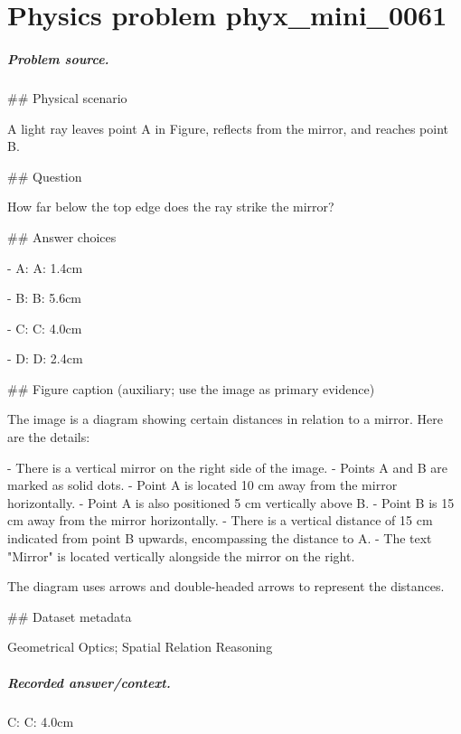
\chapter{Physics problem phyx\_mini\_0061}
\label{ch:PhyXMiniProblems_problem_phyx_mini_0061}

\paragraph{Problem source.}
\#\# Physical scenario

A light ray leaves point A in Figure, reflects from the mirror, and reaches point B.

\#\# Question

How far below the top edge does the ray strike the mirror?

\#\# Answer choices

- A: A: 1.4cm

- B: B: 5.6cm

- C: C: 4.0cm

- D: D: 2.4cm

\#\# Figure caption (auxiliary; use the image as primary evidence)

The image is a diagram showing certain distances in relation to a mirror. Here are the details:

- There is a vertical mirror on the right side of the image.
- Points A and B are marked as solid dots.
- Point A is located 10 cm away from the mirror horizontally.
- Point A is also positioned 5 cm vertically above B.
- Point B is 15 cm away from the mirror horizontally.
- There is a vertical distance of 15 cm indicated from point B upwards, encompassing the distance to A.
- The text "Mirror" is located vertically alongside the mirror on the right. 

The diagram uses arrows and double-headed arrows to represent the distances.

\#\# Dataset metadata

Geometrical Optics; Spatial Relation Reasoning

\paragraph{Recorded answer/context.}
C: C: 4.0cm

